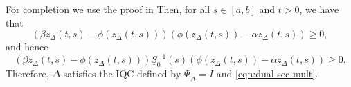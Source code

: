 For completion we use the proof in \cite{10156335}
Then, for all $s\in[a,b]$ and $t>0$, we have that
\begin{equation*}
    (\beta z_\Delta(t,s)-\phi(z_\Delta(t,s)))
    (\phi(z_\Delta(t,s))-\alpha z_\Delta(t,s))\geq0,
\end{equation*}
and hence
\begin{equation*}
    (\beta z_\Delta(t,s)-\phi(z_\Delta(t,s)))\underline S^{-1}_0(s)
    (\phi(z_\Delta(t,s))-\alpha z_\Delta(t,s))\geq0.
\end{equation*}
Therefore, $\Delta$ satisfies the IQC defined by $\underline\Psi_\Delta=I$ and \eqref{eqn:dual-sec-mult}.

